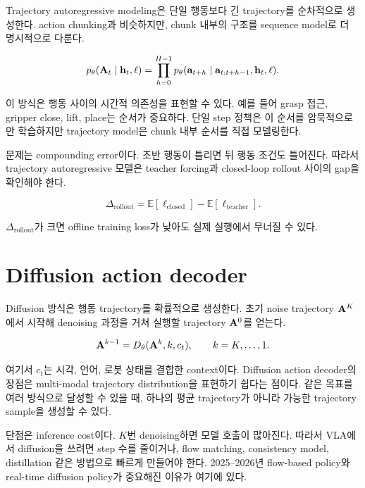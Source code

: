 Trajectory autoregressive modeling은 단일 행동보다 긴 trajectory를 순차적으로 생성한다. action chunking과 비슷하지만, chunk 내부의 구조를 sequence model로 더 명시적으로 다룬다.

\begin{equation}
  p_\theta(\mathbf{A}_t \mid \mathbf{h}_t,\ell)
  =
  \prod_{h=0}^{H-1}
  p_\theta(\mathbf{a}_{t+h}
  \mid
  \mathbf{a}_{t:t+h-1}, \mathbf{h}_t,\ell).
\end{equation}

이 방식은 행동 사이의 시간적 의존성을 표현할 수 있다. 예를 들어 grasp 접근, gripper close, lift, place는 순서가 중요하다. 단일 step 정책은 이 순서를 암묵적으로만 학습하지만 trajectory model은 chunk 내부 순서를 직접 모델링한다.

문제는 compounding error이다. 초반 행동이 틀리면 뒤 행동 조건도 틀어진다. 따라서 trajectory autoregressive 모델은 teacher forcing과 closed-loop rollout 사이의 gap을 확인해야 한다.

\begin{equation}
  \Delta_{\mathrm{rollout}}
  =
  \mathbb{E}[\ell_{\mathrm{closed}}]
  -
  \mathbb{E}[\ell_{\mathrm{teacher}}].
\end{equation}

$\Delta_{\mathrm{rollout}}$가 크면 offline training loss가 낮아도 실제 실행에서 무너질 수 있다.

\section{Diffusion action decoder}

Diffusion 방식은 행동 trajectory를 확률적으로 생성한다. 초기 noise trajectory $\mathbf{A}^K$에서 시작해 denoising 과정을 거쳐 실행할 trajectory $\mathbf{A}^0$를 얻는다.

\begin{equation}
  \mathbf{A}^{k-1}
  =
  D_\theta(\mathbf{A}^k, k, c_t),
  \qquad
  k=K,\ldots,1.
\end{equation}

여기서 $c_t$는 시각, 언어, 로봇 상태를 결합한 context이다. Diffusion action decoder의 장점은 multi-modal trajectory distribution을 표현하기 쉽다는 점이다. 같은 목표를 여러 방식으로 달성할 수 있을 때, 하나의 평균 trajectory가 아니라 가능한 trajectory sample을 생성할 수 있다.

단점은 inference cost이다. $K$번 denoising하면 모델 호출이 많아진다. 따라서 VLA에서 diffusion을 쓰려면 step 수를 줄이거나, flow matching, consistency model, distillation 같은 방법으로 빠르게 만들어야 한다. 2025--2026년 flow-based policy와 real-time diffusion policy가 중요해진 이유가 여기에 있다.

